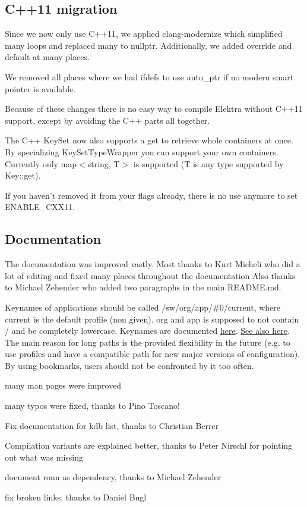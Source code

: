 \subsection*{C++11 migration}

Since we now only use C++11, we applied {\ttfamily clang-\/modernize} which simplified many loops and replaced many {} to {\ttfamily nullptr}. Additionally, we added {\ttfamily override} and {\ttfamily default} at many places.

We removed all places where we had {\ttfamily ifdefs} to use {\ttfamily auto\+\_\+ptr} if no modern smart pointer is available.

Because of these changes there is no easy way to compile Elektra without C++11 support, except by avoiding the C++ parts all together.

The C++ {\ttfamily Key\+Set} now also supports a {\ttfamily get} to retrieve whole containers at once. By specializing {\ttfamily Key\+Set\+Type\+Wrapper} you can support your own containers. Currently only {\ttfamily map$<$string, T$>$} is supported (T is any type supported by {\ttfamily Key\+::get}).

If you haven't removed it from your flags already, there is no use anymore to set {\ttfamily E\+N\+A\+B\+L\+E\+\_\+\+C\+X\+X11}.

\subsection*{Documentation}

The documentation was improved vastly. Most thanks to Kurt Micheli who did a lot of editing and fixed many places throughout the documentation Also thanks to Michael Zehender who added two paragraphs in the main R\+E\+A\+D\+M\+E.\+md.

Keynames of applications should be called {\ttfamily /sw/org/app/\#0/current}, where {\ttfamily current} is the default profile (non given). {\ttfamily org} and {\ttfamily app} is supposed to not contain {\ttfamily /} and be completely lowercase. Keynames are documented \hyperlink{md_doc_help_elektra-key-names_doc_help_elektra-key-names_md}{here}. \hyperlink{doc_tutorials_application-integration_md}{See also here}. The main reason for long paths is the provided flexibility in the future (e.\+g. to use profiles and have a compatible path for new major versions of configuration). By using bookmarks, users should not be confronted by it too often.


\begin{DoxyItemize}
\item many man pages were improved
\item many typos were fixed, thanks to Pino Toscano!
\item Fix documentation for kdb list, thanks to Christian Berrer
\item Compilation variants are explained better, thanks to Peter Nirschl for pointing out what was missing
\item document ronn as dependency, thanks to Michael Zehender
\item fix broken links, thanks to Daniel Bugl
\end{DoxyItemize}

